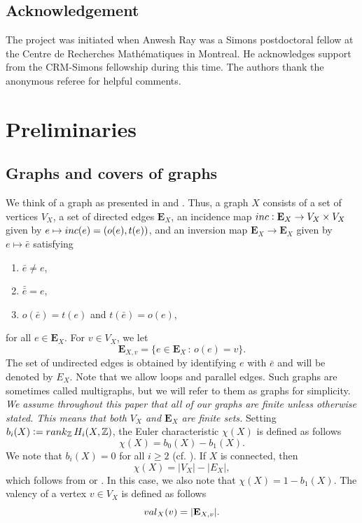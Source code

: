 \documentclass[11pt]{amsart}
\numberwithin{equation}{section}
\theoremstyle{remark}
\begin{document}
\subsection*{Acknowledgement} The project was initiated when Anwesh Ray was a Simons postdoctoral fellow at the Centre de Recherches Mathématiques in Montreal. He acknowledges support from the CRM-Simons fellowship during this time. The authors thank the anonymous referee for helpful comments.
\section{Preliminaries} \label{preliminaries}

\subsection{Graphs and covers of graphs} \label{gr}
We think of a graph as presented in \cite{Serre:1977} and \cite{Sunada:2013}.  Thus, a graph $X$ consists of a set of vertices $V_{X}$, a set of directed edges $\mathbf{E}_{X}$, an incidence map ${\rm inc}: \mathbf{E}_{X} \rightarrow V_{X} \times V_{X}$ given by $e \mapsto {\rm inc}(e) = (o(e),t(e))$, and an inversion map $\mathbf{E}_{X} \rightarrow \mathbf{E}_{X}$ given by $e \mapsto \bar{e}$ satisfying
\begin{enumerate}
\item $\bar{e} \neq e$,
\item $\bar{\bar{e}} = e$,
\item $o(\bar{e}) = t(e)$ and $t(\bar{e}) = o(e)$,
\end{enumerate}
for all $e \in \mathbf{E}_{X}$.  For $v \in V_{X}$, we let
$$\mathbf{E}_{X,v} = \{e \in \mathbf{E}_{X} \, : \, o(e) = v \}. $$
The set of undirected edges is obtained by identifying $e$ with $\bar{e}$ and will be denoted by $E_{X}$.  Note that we allow loops and parallel edges.  Such graphs are sometimes called multigraphs, but we will refer to them as graphs for simplicity.  \emph{We assume throughout this paper that all of our graphs are finite unless otherwise stated.  This means that both $V_{X}$ and $\mathbf{E}_{X}$ are finite sets.}  Setting $b_{i}(X) := {\rm rank}_{\mathbb{Z}}\, H_{i}(X,\mathbb{Z})$, the Euler characteristic $\chi(X)$ is defined as follows
$$\chi(X) = b_{0}(X) - b_{1}(X).$$ We note that $b_i(X)=0$ for all $i\geq 2$ (cf. \cite[p. 140 l. 7]{HatcherAT}).
If $X$ is connected, then
$$\chi(X) = |V_{X}| - |E_{X}|,$$ which follows from \cite[Section 4.4]{Sunada:2013} or \cite[Theorem 2.44]{HatcherAT}. In this case, we also note that $\chi(X) = 1 - b_{1}(X)$. The valency of a vertex $v \in V_{X}$ is defined as follows
$${\rm val}_{X}(v) = |\mathbf{E}_{X,v}|. $$
\end{document}
